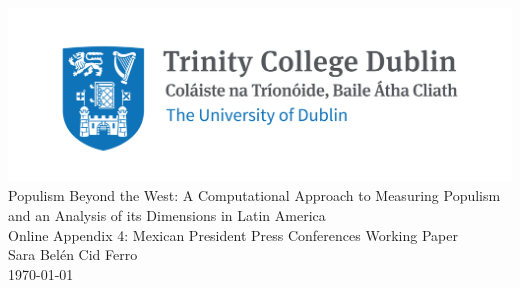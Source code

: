 \documentclass[12pt,letterpaper]{article}
\begin{document}
	
	
	\begin{titlepage}
		\centering
		\vspace*{1cm} %
		
		\includegraphics[width=\textwidth]{Trinity_RGB_transparent_main.png}\\[1cm]
		
		{\LARGE Populism Beyond the West: A Computational Approach to Measuring Populism and an Analysis of its Dimensions in Latin America}\\[1cm]
		{\Large Online Appendix 4: Mexican President Press Conferences Working Paper}\\[0.3cm]
		
		\Large Sara Belén Cid Ferro \\[1cm]
		
		{\large \today}
	\end{titlepage}
	
\end{document}
